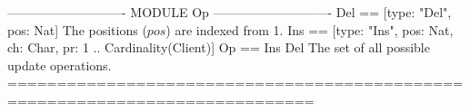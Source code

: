 \documentclass{article}
\begin{document}
\begin{tla}
---------------------------- MODULE Op ----------------------------
Del == [type: {"Del"}, pos: Nat] \* The positions ($pos$) are indexed from 1.
Ins == [type: {"Ins"}, pos: Nat, ch: Char, pr: 1 .. Cardinality(Client)]
Op == Ins \cup Del \* The set of all possible update operations.
=============================================================================
\end{tla}
\end{document}

